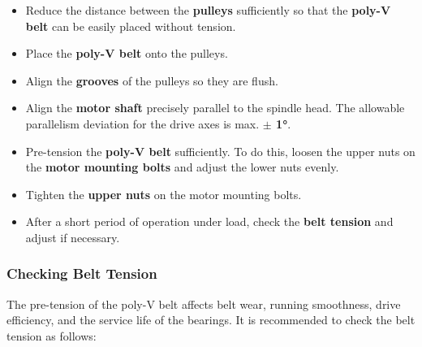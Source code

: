 \begin{itemize}
    \item Reduce the distance between the \textbf{pulleys} sufficiently so that the \textbf{poly-V belt} can be easily placed without tension.
    \item Place the \textbf{poly-V belt} onto the pulleys.
    \item Align the \textbf{grooves} of the pulleys so they are flush.
    \item Align the \textbf{motor shaft} precisely parallel to the spindle head.  
          The allowable parallelism deviation for the drive axes is max. \textbf{$\pm$ 1°}.
    \item Pre-tension the \textbf{poly-V belt} sufficiently.  
          To do this, loosen the upper nuts on the \textbf{motor mounting bolts} and adjust the lower nuts evenly.
\end{itemize}


\begin{itemize}
    \item Tighten the \textbf{upper nuts} on the motor mounting bolts.
    \item After a short period of operation under load, check the \textbf{belt tension} and adjust if necessary.
\end{itemize}

\subsubsection*{Checking Belt Tension}

The pre-tension of the poly-V belt affects belt wear, running smoothness, drive efficiency, and the service life of the bearings.  
It is recommended to check the belt tension as follows:

